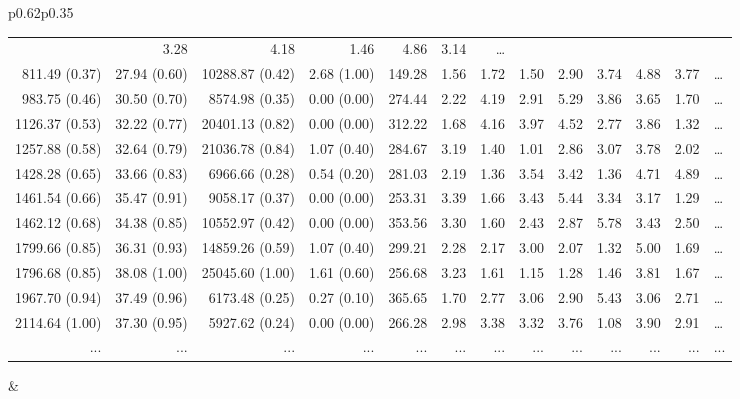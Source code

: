 \documentclass[AMA,STIX2COL]{WileyNJDv5}
\begin{document}
\begin{table}[t]
\begin{tabular}{p{}p{}}
{\begin{tabular}{rrrr|rrrrrrrrl}
  & 3.28 & 4.18 & 1.46 & 4.86 & 3.14 & \ldots \\
811.49 (0.37) & 27.94 (0.60) & 10288.87 (0.42) & 2.68 (1.00) & 149.28 & 1.56 & 1.72
  & 1.50 & 2.90 & 3.74 & 4.88 & 3.77 & \ldots \\
983.75 (0.46) & 30.50 (0.70) & 8574.98 (0.35) & 0.00 (0.00) & 274.44 & 2.22 & 4.19
  & 2.91 & 5.29 & 3.86 & 3.65 & 1.70 & \ldots \\
1126.37 (0.53) & 32.22 (0.77) & 20401.13 (0.82) & 0.00 (0.00) & 312.22 & 1.68 & 4.16
  & 3.97 & 4.52 & 2.77 & 3.86 & 1.32 & \ldots \\
1257.88 (0.58) & 32.64 (0.79) & 21036.78 (0.84) & 1.07 (0.40) & 284.67 & 3.19 & 1.40
  & 1.01 & 2.86 & 3.07 & 3.78 & 2.02 & \ldots \\
1428.28 (0.65) & 33.66 (0.83) & 6966.66 (0.28) & 0.54 (0.20) & 281.03 & 2.19 & 1.36
  & 3.54 & 3.42 & 1.36 & 4.71 & 4.89 & \ldots \\
1461.54 (0.66) & 35.47 (0.91) & 9058.17 (0.37) & 0.00 (0.00) & 253.31 & 3.39 & 1.66
  & 3.43 & 5.44 & 3.34 & 3.17 & 1.29 & \ldots \\
1462.12 (0.68) & 34.38 (0.85) & 10552.97 (0.42) & 0.00 (0.00) & 353.56 & 3.30 & 1.60
  & 2.43 & 2.87 & 5.78 & 3.43 & 2.50 & \ldots \\
1799.66 (0.85) & 36.31 (0.93) & 14859.26 (0.59) & 1.07 (0.40) & 299.21 & 2.28 & 2.17
  & 3.00 & 2.07 & 1.32 & 5.00 & 1.69 & \ldots \\
1796.68 (0.85) & 38.08 (1.00) & 25045.60 (1.00) & 1.61 (0.60) & 256.68 & 3.23 & 1.61
  & 1.15 & 1.28 & 1.46 & 3.81 & 1.67 & \ldots \\
1967.70 (0.94) & 37.49 (0.96) & 6173.48 (0.25) & 0.27 (0.10) & 365.65 & 1.70 & 2.77
  & 3.06 & 2.90 & 5.43 & 3.06 & 2.71 & \ldots \\
2114.64 (1.00) & 37.30 (0.95) & 5927.62 (0.24) & 0.00 (0.00) & 266.28 & 2.98 & 3.38
  & 3.32 & 3.76 & 1.08 & 3.90 & 2.91 & \ldots \\
... & ... & ... & ... & ... & ... & ... & ... & ... & ... & ... & ... & ...
\end{tabular}}
&
\end{tabular}
\end{table}
\end{document}

